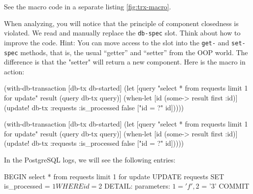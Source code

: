 
See the macro code in a separate listing \ref{fig:trx-macro}.

When analyzing, you will notice that the principle of component closedness is violated. We read and manually replace the \verb|db-spec| slot. Think about how to improve the code. Hint: You can move access to the slot into the \verb|get-| and \verb|set-spec| methods, that is, the usual ``getter'' and ``setter'' from the OOP world. The difference is that the "setter" will return a new component. Here is the macro in action:

\ifnarrow

\begin{english}
  \begin{clojure}
(with-db-transaction
  [db-tx db-started]
  (let [query "select * from requests
               limit 1 for update"
        result (query db-tx query)]
    (when-let [id (some->
                    result first :id)]
      (update! db-tx :requests
               {:is_processed false}
               ["id = ?" id]))))
  \end{clojure}
\end{english}

\else

\begin{english}
  \begin{clojure}
(with-db-transaction
  [db-tx db-started]
  (let [query "select * from requests limit 1 for update"
        result (query db-tx query)]
    (when-let [id (some-> result first :id)]
      (update! db-tx :requests
               {:is_processed false}
               ["id = ?" id]))))
  \end{clojure}
\end{english}

\fi

\noindent
In the PostgreSQL logs, we will see the following entries:


\ifnarrow

\begin{english}
  \begin{sql}
BEGIN
select * from requests
limit 1 for update
UPDATE requests SET is_processed = $1
WHERE id = $2
DETAIL:  parameters: $1 = 'f', $2 = '3'
COMMIT
  \end{sql}
\end{english}

\else

